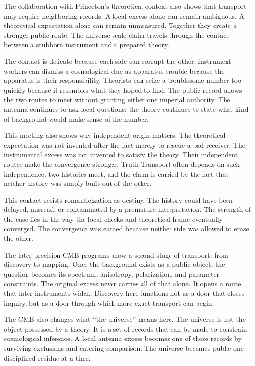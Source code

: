 The collaboration with Princeton's theoretical context also shows that
transport may require neighboring records. A local excess alone can
remain ambiguous. A theoretical expectation alone can remain unmeasured.
Together they create a stronger public route. The universe-scale claim
travels through the contact between a stubborn instrument and a prepared
theory.

The contact is delicate because each side can corrupt the other.
Instrument workers can dismiss a cosmological clue as apparatus trouble
because the apparatus is their responsibility. Theorists can seize a
troublesome number too quickly because it resembles what they hoped to
find. The public record allows the two routes to meet without granting
either one imperial authority. The antenna continues to ask local
questions; the theory continues to state what kind of background would
make sense of the number.

This meeting also shows why independent origin matters. The theoretical
expectation was not invented after the fact merely to rescue a bad
receiver. The instrumental excess was not invented to satisfy the theory.
Their independent routes make the convergence stronger. Truth Transport
often depends on such independence: two histories meet, and the claim is
carried by the fact that neither history was simply built out of the
other.

This contact resists romanticization as destiny. The history could have
been delayed, misread, or contaminated by a premature interpretation. The
strength of the case lies in the way the local checks and theoretical
frame eventually converged. The convergence was earned because neither
side was allowed to erase the other.

The later precision CMB programs show a second stage of transport: from
discovery to mapping. Once the background exists as a public object, the
question becomes its spectrum, anisotropy, polarization, and parameter
constraints. The original excess never carries all of that alone. It
opens a route that later instruments widen. Discovery here functions not
as a door that closes inquiry, but as a door through which more exact
transport can begin.

The CMB also changes what ``the universe'' means here. The universe is
not the object possessed by a theory. It is a set of records that can be
made to constrain cosmological inference. A local antenna excess becomes
one of those records by surviving exclusions and entering comparison. The
universe becomes public one disciplined residue at a time.

